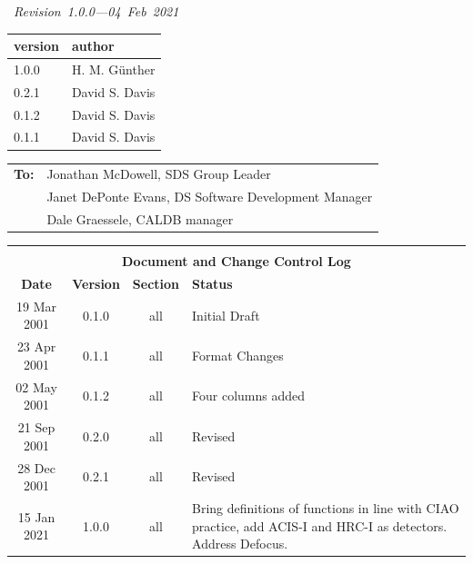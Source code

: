 \documentclass[twoside]{article}
\newcommand{\Revision}{\mbox{\em%
Revision 1.0.0---04 Feb 2021 %
}}
\begin{document}
\begin{titlepage}
\begin{center}
    \Revision

    \vfill

    \begin{tabular}{|l|l|}
      \hline
      version & author\\\hline\hline
      1.0.0 & H. M. G\"unther\\\hline
      0.2.1 & David S. Davis\\\hline
      0.1.2 & David S. Davis\\\hline
      0.1.1 & David S. Davis\\\hline
    \end{tabular}
  \end{center}
  \begin{tabular}{ll}
    \textbf{To:} & Jonathan McDowell, SDS Group Leader\\
    & Janet DePonte Evans, DS Software Development Manager\\
    & Dale Graessele, CALDB manager\\
    \end{tabular}

\end{titlepage}


\setcounter{page}{2}


\begin{center}
\begin{tabular}{|c|c|c|p{2.5in}|} \hline
\multicolumn{4}{|c|}{}\\[1mm]
\multicolumn{4}{|c|}{\bf Document and Change Control Log}\\[3mm]\hline
{\bf Date} & {\bf Version} & {\bf Section} & {\bf Status} \\ \hline
19 Mar 2001& 0.1.0 & all&Initial Draft \\\hline
23 Apr 2001& 0.1.1 & all&Format Changes \\\hline
02 May 2001& 0.1.2 & all&Four columns added \\\hline
21 Sep 2001& 0.2.0 & all&Revised \\\hline
28 Dec 2001& 0.2.1 & all&Revised \\\hline
15 Jan 2021& 1.0.0 & all & Bring definitions of functions in line with CIAO practice, add ACIS-I and HRC-I as detectors. Address Defocus.\\\hline
%
\hline
%
\end{tabular}
\end{center}
\end{document}
